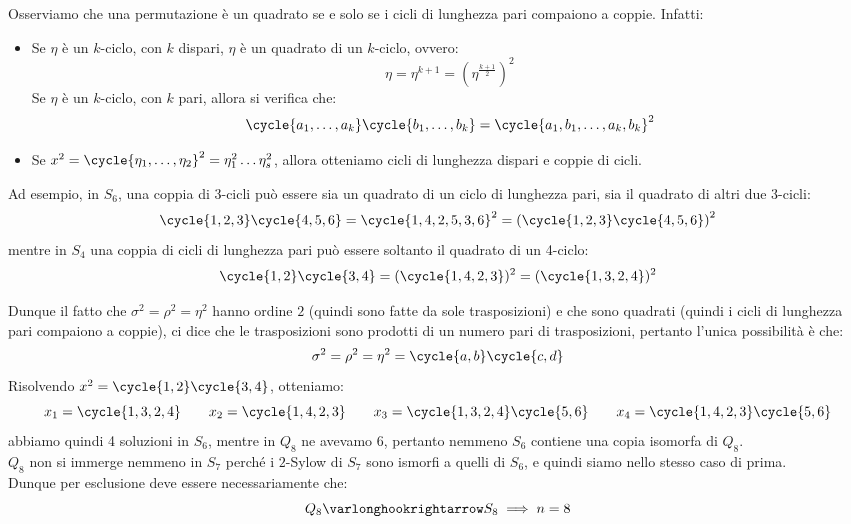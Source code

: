 \documentclass[11pt]{scrartcl}
\begin{document}
\begin{soln}
    \begin{remark}
        Osserviamo che una permutazione è un quadrato se e solo se i cicli di lunghezza pari compaiono a coppie. Infatti:
            \begin{itemize}
                \item Se $\eta$ è un $k$-ciclo, con $k$ dispari, $\eta$ è un quadrato di un $k$-ciclo, ovvero:
                        \[ \eta = \eta^{k+1} = \left(\eta^{\frac{k+1}{2}}\right)^2
                            \]
                Se $\eta$ è un $k$-ciclo, con $k$ pari, allora si verifica che:
                        \[ \cycle{a_1,\ldots,a_k}\cycle{b_1,\ldots,b_k} = \cycle{a_1,b_1,\ldots,a_k,b_k}^2
                            \]
                \item Se $x^2 = \cycle{\eta_1, \ldots, \eta_2}^2 = \eta_1^2 \ldots \eta_s^2$, allora otteniamo cicli di lunghezza dispari e coppie di cicli.
            \end{itemize}
        Ad esempio, in $S_6$, una coppia di 3-cicli può essere sia un quadrato di un ciclo di lunghezza pari, sia il quadrato di altri due 3-cicli:
            \[ \cycle{1,2,3}\cycle{4,5,6} = \cycle{1,4,2,5,3,6}^2 = \left(\cycle{1,2,3}\cycle{4,5,6}\right)^2
                \]
        mentre in $S_4$ una coppia di cicli di lunghezza pari può essere soltanto il quadrato di un 4-ciclo:
            \[ \cycle{1,2}\cycle{3,4} = (\cycle{1,4,2,3})^2 = (\cycle{1,3,2,4})^2
                \]
    \end{remark}
    Dunque il fatto che $\sigma^2 = \rho^2 = \eta^2$ hanno ordine $2$ (quindi sono fatte da sole trasposizioni) e che sono quadrati (quindi i cicli di lunghezza pari compaiono a coppie),
    ci dice che le trasposizioni sono prodotti di un numero pari di trasposizioni, pertanto l'unica possibilità è che:
        \[ \sigma^2 = \rho^2 = \eta^2 = \cycle{a,b}\cycle{c,d}
            \]
    Risolvendo $x^2 = \cycle{1,2}\cycle{3,4}$, otteniamo:
        \[ x_1 = \cycle{1,3,2,4} \qquad x_2 = \cycle{1,4,2,3} \qquad x_3 = \cycle{1,3,2,4}\cycle{5,6} \qquad x_4 = \cycle{1,4,2,3}\cycle{5,6}
            \]
    abbiamo quindi 4 soluzioni in $S_6$, mentre in $Q_8$ ne avevamo 6, pertanto nemmeno $S_6$ contiene una copia isomorfa di $Q_8$.\\
    $Q_8$ non si immerge nemmeno in $S_7$ perché i $2$-Sylow di $S_7$ sono ismorfi a quelli di $S_6$, e quindi siamo nello stesso caso di prima. \\
    Dunque per esclusione deve essere necessariamente che:
        \[ Q_8 \varlonghookrightarrow S_8 \implies n = 8
\]
\end{soln}
\end{document}
